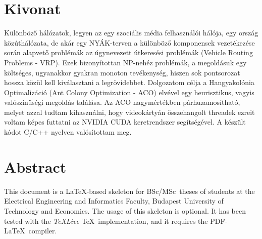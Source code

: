 \setcounter{page}{1}

\selecthungarian

\chapter*{Kivonat}

Különböző hálózatok, legyen az egy szociális média felhasználói hálója, egy ország közúthálózata, de akár egy NYÁK-terven a különböző komponensek vezetékezése során alapvető problémák az úgynevezett útkeresési problémák (Vehicle Routing Problems - VRP). Ezek bizonyítottan NP-nehéz problémák, a megoldásuk egy költséges, ugyanakkor gyakran monoton tevékenység, hiszen sok pontsorozat hossza közül kell kiválasztani a legrövidebbet. Dolgozatom célja a Hangyakolónia Optimalizáció (Ant Colony Optimization - ACO) elvével egy heurisztikus, vagyis valószínűségi megoldás találása. Az ACO nagymértékben párhuzamosítható, melyet azzal tudtam kihasználni, hogy videokártyán összehangolt threadek ezreit voltam képes futtatni az NVIDIA CUDA keretrendszer segítségével. A készült kódot C/C++ nyelven valósítottam meg.


\vfill
\selectenglish


\chapter*{Abstract}

This document is a \LaTeX-based skeleton for BSc/MSc~theses of students at the Electrical Engineering and Informatics Faculty, Budapest University of Technology and Economics. The usage of this skeleton is optional. It has been tested with the \emph{TeXLive} \TeX~implementation, and it requires the PDF-\LaTeX~compiler.


\vfill
\selectthesislanguage

\setcounter{romanPage}{\value{page}}
